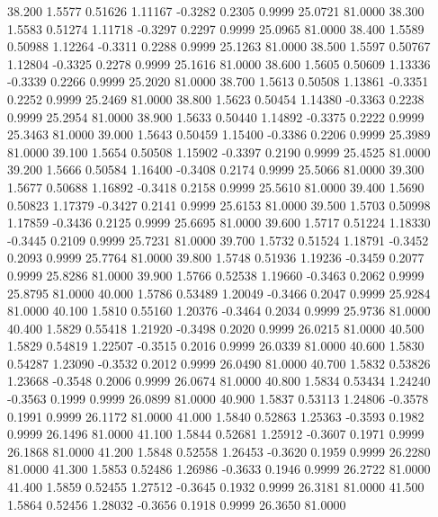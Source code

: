  38.200   1.5577   0.51626   1.11167  -0.3282   0.2305   0.9999  25.0721  81.0000
  38.300   1.5583   0.51274   1.11718  -0.3297   0.2297   0.9999  25.0965  81.0000
  38.400   1.5589   0.50988   1.12264  -0.3311   0.2288   0.9999  25.1263  81.0000
  38.500   1.5597   0.50767   1.12804  -0.3325   0.2278   0.9999  25.1616  81.0000
  38.600   1.5605   0.50609   1.13336  -0.3339   0.2266   0.9999  25.2020  81.0000
  38.700   1.5613   0.50508   1.13861  -0.3351   0.2252   0.9999  25.2469  81.0000
  38.800   1.5623   0.50454   1.14380  -0.3363   0.2238   0.9999  25.2954  81.0000
  38.900   1.5633   0.50440   1.14892  -0.3375   0.2222   0.9999  25.3463  81.0000
  39.000   1.5643   0.50459   1.15400  -0.3386   0.2206   0.9999  25.3989  81.0000
  39.100   1.5654   0.50508   1.15902  -0.3397   0.2190   0.9999  25.4525  81.0000
  39.200   1.5666   0.50584   1.16400  -0.3408   0.2174   0.9999  25.5066  81.0000
  39.300   1.5677   0.50688   1.16892  -0.3418   0.2158   0.9999  25.5610  81.0000
  39.400   1.5690   0.50823   1.17379  -0.3427   0.2141   0.9999  25.6153  81.0000
  39.500   1.5703   0.50998   1.17859  -0.3436   0.2125   0.9999  25.6695  81.0000
  39.600   1.5717   0.51224   1.18330  -0.3445   0.2109   0.9999  25.7231  81.0000
  39.700   1.5732   0.51524   1.18791  -0.3452   0.2093   0.9999  25.7764  81.0000
  39.800   1.5748   0.51936   1.19236  -0.3459   0.2077   0.9999  25.8286  81.0000
  39.900   1.5766   0.52538   1.19660  -0.3463   0.2062   0.9999  25.8795  81.0000
  40.000   1.5786   0.53489   1.20049  -0.3466   0.2047   0.9999  25.9284  81.0000
  40.100   1.5810   0.55160   1.20376  -0.3464   0.2034   0.9999  25.9736  81.0000
  40.400   1.5829   0.55418   1.21920  -0.3498   0.2020   0.9999  26.0215  81.0000
  40.500   1.5829   0.54819   1.22507  -0.3515   0.2016   0.9999  26.0339  81.0000
  40.600   1.5830   0.54287   1.23090  -0.3532   0.2012   0.9999  26.0490  81.0000
  40.700   1.5832   0.53826   1.23668  -0.3548   0.2006   0.9999  26.0674  81.0000
  40.800   1.5834   0.53434   1.24240  -0.3563   0.1999   0.9999  26.0899  81.0000
  40.900   1.5837   0.53113   1.24806  -0.3578   0.1991   0.9999  26.1172  81.0000
  41.000   1.5840   0.52863   1.25363  -0.3593   0.1982   0.9999  26.1496  81.0000
  41.100   1.5844   0.52681   1.25912  -0.3607   0.1971   0.9999  26.1868  81.0000
  41.200   1.5848   0.52558   1.26453  -0.3620   0.1959   0.9999  26.2280  81.0000
  41.300   1.5853   0.52486   1.26986  -0.3633   0.1946   0.9999  26.2722  81.0000
  41.400   1.5859   0.52455   1.27512  -0.3645   0.1932   0.9999  26.3181  81.0000
  41.500   1.5864   0.52456   1.28032  -0.3656   0.1918   0.9999  26.3650  81.0000
